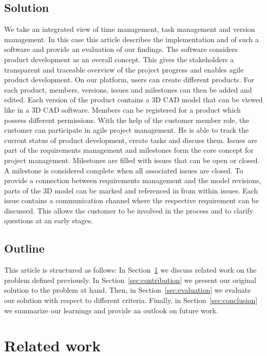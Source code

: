     
    
    
    
     

    \subsection*{Solution}
    We take an integrated view of time management, task management and version management.  In this case this article describes the implementation and of such a software and provide an evaluation of our findings.
    The software considers product development as an overall concept. This gives the stakeholders a transparent and traceable overview of the project progress and enables agile product development.
    On our platform, users can create different products. For each product, members, versions, issues and milestones can then be added and edited. Each version of the product contains a 3D CAD model that can be viewed like in a 3D CAD software. Members can be registered for a product which possess different permissions. 
    With the help of the customer member role, the customer can participate in agile project management.
    He is able to track the current status of product development, create tasks and discuss them.
    Issues are part of the requirements management and milestones form the core concept for project management.
    Milestones are filled with issues that can be open or closed. A milestone is considered complete when all associated issues are closed.
    To provide a connection between requirements management and the model revisions, parts of the 3D model can be marked and referenced in from within issues.
    Each issue contains a communication channel where the respective requirement can be discussed. This allows the customer to be involved in the process and to clarify questions at an early stages.

    \subsection*{Outline}
    This article is structured as follows:
    In Section~\ref{sec:differentiation} we discuss related work on the problem defined previously.
    In Section~\ref{sec:contribution} we present our original solution to the problem at hand.
    Then, in Section~\ref{sec:evaluation} we evaluate our solution with respect to different criteria.
    Finally, in Section~\ref{sec:conclusion} we summarize our learnings and provide an outlook on future work.
    
    \section{Related work}
    \label{sec:differentiation}

